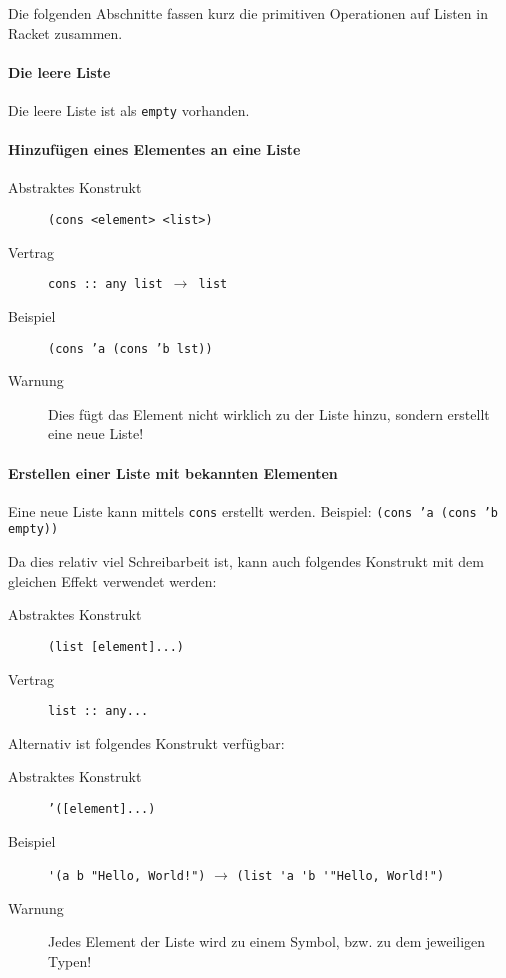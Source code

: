 Die folgenden Abschnitte fassen kurz die primitiven Operationen auf Listen in Racket zusammen.

\paragraph{Die leere Liste}
Die leere Liste ist als \texttt{empty} vorhanden.

\paragraph{Hinzufügen eines Elementes an eine Liste}
\begin{description}
	\item[Abstraktes Konstrukt] \texttt{(cons <element> <list>)}
	\item[Vertrag] \texttt{cons :: any list $ \rightarrow $ list}
	\item[Beispiel] \texttt{(cons 'a (cons 'b lst))}
	\item[Warnung] Dies fügt das Element nicht wirklich zu der Liste hinzu, sondern erstellt eine neue Liste!
\end{description}

\paragraph{Erstellen einer Liste mit bekannten Elementen}
Eine neue Liste kann mittels \texttt{cons} erstellt werden. Beispiel: \texttt{(cons 'a (cons 'b empty))}

Da dies relativ viel Schreibarbeit ist, kann auch folgendes Konstrukt mit dem gleichen Effekt verwendet werden:
\begin{description}
	\item[Abstraktes Konstrukt] \texttt{(list [element]...)}
	\item[Vertrag] \texttt{list :: any...}
\end{description}

Alternativ ist folgendes Konstrukt verfügbar:
\begin{description}
	\item[Abstraktes Konstrukt] \texttt{'([element]...)}
	\item[Beispiel] \verb$'(a b "Hello, World!")$ $ \rightarrow $ \verb$(list 'a 'b '"Hello, World!")$
	\item[Warnung] Jedes Element der Liste wird zu einem Symbol, bzw. zu dem jeweiligen Typen!
\end{description}

